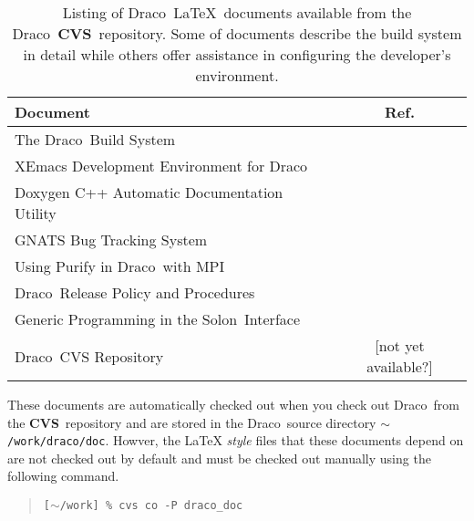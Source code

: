 \documentclass[11pt]{nmemo}
\newcommand{\comp}[1]{\normalfont\normalsize\texttt{#1}}
\newcommand{\draco}{{\normalfont\sffamily Draco}}
\newcommand{\solon}{{\normalfont\sffamily Solon}}
\newcommand{\cvs}{{\normalfont\bfseries CVS}}
\begin{document}

\begin{table}
  \caption{Listing of \draco\ \LaTeX\ documents available from the
    \draco\ \cvs\ repository.  Some of documents describe the build
    system in detail while others offer assistance in configuring the
    developer's environment.}
  \label{tab:draco_docs}
  \begin{center}
    \begin{tabular}{lc} \hline\hline
      \multicolumn{1}{l}{Document} & \multicolumn{1}{c}{Ref.} \\ \hline
      The \draco\ Build System               & ~\cite{draco-build} \\
      XEmacs Development Environment for \draco & ~\cite{xtm:9909} \\
      Doxygen C++ Automatic Documentation Utility & ~\cite{doxygen} \\
      GNATS Bug Tracking System              & ~\cite{draco-gnats} \\
      Using Purify in \draco\ with MPI       & ~\cite{draco-purify} \\
      \draco\ Release Policy and Procedures  & ~\cite{xtm:9936}    \\
      Generic Programming in the \solon\ Interface & ~\cite{ro98} \\
      \draco\ CVS Repository                 & [not yet available?] \\
      \hline\hline
    \end{tabular}
  \end{center}
\end{table}

These documents are automatically checked out when you check out
\draco\ from the \cvs\ repository and are stored in the \draco\ source
directory \comp{$\sim$/work/draco/doc}.  Howver, the \LaTeX
\emph{style} files that these documents depend on are not checked out
by default and must be checked out manually using the following
command.

\begin{quote}
\texttt{[$\sim$/work] \% cvs co -P draco\_doc}
\end{quote}
\end{document}

